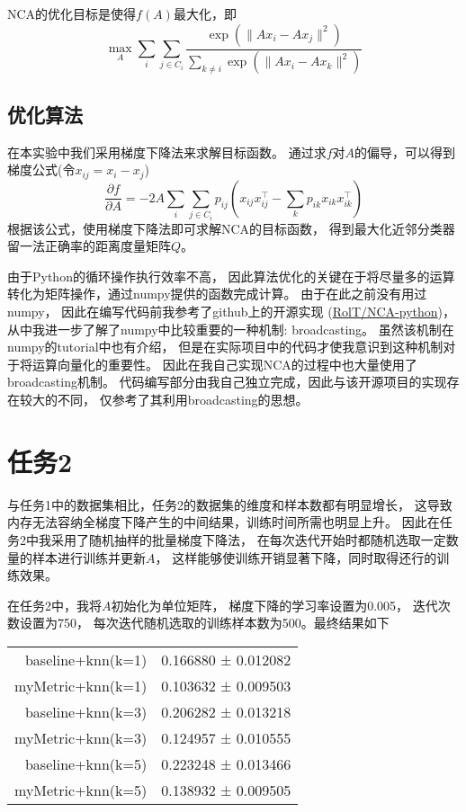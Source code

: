 \documentclass[a4paper,UTF8]{article}
\theoremstyle{definition}
\begin{document}
NCA的优化目标是使得$f(A)$最大化，即
\[
	\max_{A} \sum_{i} \sum_{j \in C_{i}}
	\frac{\exp(\lVert Ax_{i} - Ax_{j} \rVert^2)}
	{\sum_{k \neq i} \exp(\lVert Ax_{i} - Ax_{k} \rVert^2)}
\]

\subsection*{优化算法}

在本实验中我们采用梯度下降法来求解目标函数。
通过求$f$对$A$的偏导，可以得到梯度公式(令$x_{ij} = x_{i} - x_{j}$)
\[
	\frac{\partial f}{\partial A} =
	-2A \sum_{i} \sum_{j \in C_{i}}
	p_{ij}( x_{ij} x_{ij}^\top - \sum_{k} p_{ik} x_{ik} x_{ik}^\top)
\]
根据该公式，使用梯度下降法即可求解NCA的目标函数，
得到最大化近邻分类器留一法正确率的距离度量矩阵$Q$。

由于Python的循环操作执行效率不高，
因此算法优化的关键在于将尽量多的运算转化为矩阵操作，通过numpy提供的函数完成计算。
由于在此之前没有用过numpy，
因此在编写代码前我参考了github上的开源实现
(\href{https://github.com/RolT/NCA-python}{RolT/NCA-python})，
从中我进一步了解了numpy中比较重要的一种机制: broadcasting。
虽然该机制在numpy的tutorial中也有介绍，
但是在实际项目中的代码才使我意识到这种机制对于将运算向量化的重要性。
因此在我自己实现NCA的过程中也大量使用了broadcasting机制。
代码编写部分由我自己独立完成，因此与该开源项目的实现存在较大的不同，
仅参考了其利用broadcasting的思想。

\section*{任务2}

与任务1中的数据集相比，任务2的数据集的维度和样本数都有明显增长，
这导致内存无法容纳全梯度下降产生的中间结果，训练时间所需也明显上升。
因此在任务2中我采用了随机抽样的批量梯度下降法，
在每次迭代开始时都随机选取一定数量的样本进行训练并更新$A$，
这样能够使训练开销显著下降，同时取得还行的训练效果。

在任务2中，我将$A$初始化为单位矩阵，
梯度下降的学习率设置为0.005，
迭代次数设置为750，
每次迭代随机选取的训练样本数为500。最终结果如下

\begin{table}[htbp]
  \centering
  \begin{tabular}{rr}
	\hline
	baseline+knn(k=1) & 0.166880 ± 0.012082 \\
	myMetric+knn(k=1) & 0.103632 ± 0.009503 \\
	baseline+knn(k=3) & 0.206282 ± 0.013218 \\
	myMetric+knn(k=3) & 0.124957 ± 0.010555 \\
	baseline+knn(k=5) & 0.223248 ± 0.013466 \\
	myMetric+knn(k=5) & 0.138932 ± 0.009505 \\
	\hline
  \end{tabular}
\end{table}

\nocite{*}

\end{document}
